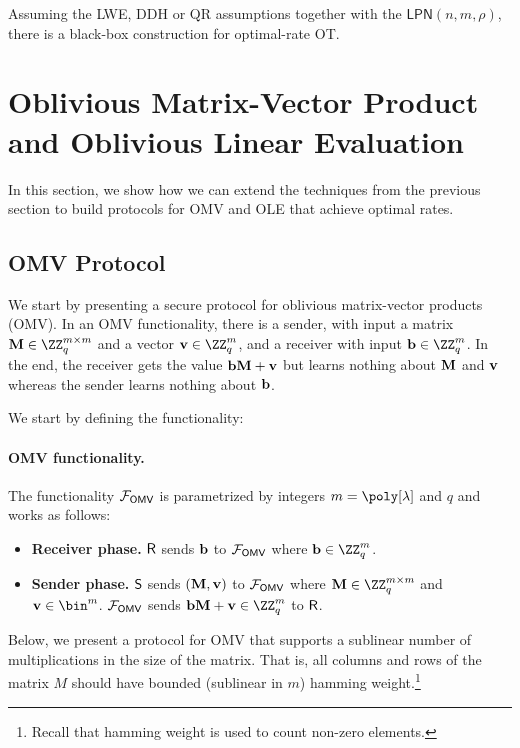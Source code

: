 \begin{corollary}
Assuming the LWE, DDH or QR assumptions together with the $\mathsf{LPN}(n,m,\rho)$, there is a black-box construction for optimal-rate OT.
\end{corollary}

\section{Oblivious Matrix-Vector Product and Oblivious Linear Evaluation}
\label{sec:OMVandOLE}

In this section, we show how we can extend the techniques from the previous section to build protocols for OMV and OLE that achieve optimal rates.

\subsection{OMV Protocol}
\label{sec:rate1OMV}

We start by presenting a secure protocol for oblivious matrix-vector products (OMV). In an OMV functionality, there is a sender, with input a matrix $\Mn\in\ZZ_q^{m\times m}$ and a vector $\vn\in\ZZ_q^m$, and a receiver with input $\bn\in\ZZ_q^m$. In the end, the receiver gets the value $\mathbf{b}\mathbf{M}+\mathbf{v}$ but learns nothing about $\mathbf{M}$ and $\mathbf{v}$ whereas the sender learns nothing about $\mathbf{b}$.

We start by defining the functionality:
\paragraph{OMV functionality.}  The functionality $\mathcal{F}_{\mathsf{OMV}}$ is parametrized by integers $m=\poly[\lambda]$ and $q$ and works as follows:
\begin{itemize}
    \item \textbf{Receiver phase.} $\mathsf{R}$ sends $\mathbf{b}$ to  $\mathcal{F}_{\mathsf{OMV}}$ where $\bn\in\ZZ_q^m$.

  \item \textbf{Sender phase.}
      $\mathsf{S}$ sends $(\mathbf{M},\mathbf{v})$ to $\mathcal{F}_{\mathsf{OMV}}$ where $\Mn\in\ZZ_q^{m\times m}$ and $\vn\in\bin^m$. $\mathcal{F}_{\mathsf{OMV}}$ sends $\bn\Mn + \vn\in\ZZ_q^m$ to $\mathsf{R}$. 
\end{itemize}


Below, we present a protocol for OMV that supports a sublinear number of multiplications in the size of the matrix. That is, all columns and rows of the matrix $M$ should have bounded (sublinear in $m$) hamming weight.\footnote{Recall that hamming weight is used to count non-zero elements.}

